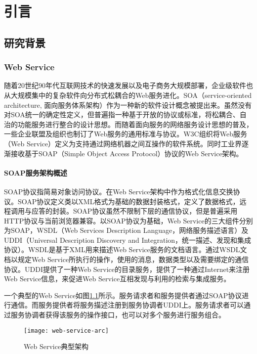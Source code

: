 

\chapter{引言}
\label{cha:intro}
\section{研究背景}
\subsection{Web Service}
随着20世纪90年代互联网技术的快速发展以及电子商务大规模部署，企业级软件也从大规模集中的复杂软件向分布式松耦合的Web服务进化。SOA（service-oriented architecture, 面向服务体系架构）作为一种新的软件设计概念被提出来。虽然没有对SOA统一的确定性定义，但普遍指一种基于开放的协议或标准，将松耦合、自治的功能服务进行整合的设计思想。而随着面向服务的网络服务设计思想的普及，一些企业联盟及组织也制订了Web服务的通用标准与协议。W3C组织将Web服务（Web Service）定义为支持通过网络机器之间互操作的软件系统。\cite{haas2004web}同时工业界逐渐接收基于SOAP（Simple Object Access Protocol）协议的Web Service架构。
\subsubsection{SOAP服务架构概述}
SOAP协议指简易对象访问协议。在Web Service架构中作为格式化信息交换协议。SOAP协议定义类以XML格式为基础的数据封装格式，定义了数据格式，远程调用与应答的封装。SOAP协议虽然不限制下层的通信协议，但是普遍采用HTTP协议与当前浏览器兼容。以SOAP协议为基础，Web Service的三大组件分别为SOAP，WSDL（Web Services Description Language，网络服务描述语言）及UDDI（Universal Description Discovery and Integration，统一描述、发现和集成协议）。WSDL是基于XML用来描述Web Service服务的文档语言。通过WSDL文档以规定Web Service所执行的操作，使用的消息，数据类型以及需要绑定的通信协议。UDDI提供了一种Web Service的目录服务，提供了一种通过Internet来注册Web Service信息，来促进Web Service互相发现与利用的检索与集成服务。

一个典型的Web Service如图\ref{fig:web-service-arc}所示。服务请求者和服务提供者通过SOAP协议进行通信。而服务提供者将服务描述注册到服务协调者UDDI上。服务请求者可以通过服务协调者获得该服务的操作接口，也可以对多个服务进行服务组合。
\begin{figure}[H]
  \centering
  \texttt{[image: web-service-arc]}
  \caption{Web Service典型架构}
  \label{fig:web-service-arc}
\end{figure}

